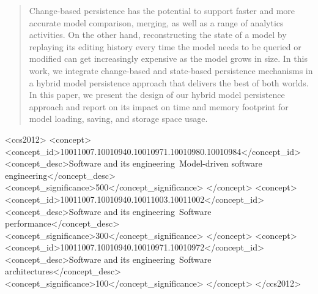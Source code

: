 \documentclass[sigplan,review,anonymous]{acmart}\settopmatter{printfolios=true,printccs=false,printacmref=false}
\begin{document}


\begin{abstract}
Change-based persistence has the potential to support faster and more accurate model comparison, merging, as well as a range of analytics activities. On the other hand, reconstructing the state of a model by replaying its editing history every time the model needs to be queried or modified can get increasingly expensive as the model grows in size. In this work, we integrate change-based and state-based persistence mechanisms in a hybrid model persistence approach that delivers the best of both worlds. In this paper, we present the design of our hybrid model persistence approach and report on its impact on time and memory footprint for model loading, saving, and storage space usage.
\end{abstract}


\begin{CCSXML}
    <ccs2012>
    <concept>
    <concept_id>10011007.10010940.10010971.10010980.10010984</concept_id>
    <concept_desc>Software and its engineering~Model-driven software engineering</concept_desc>
    <concept_significance>500</concept_significance>
    </concept>
    <concept>
    <concept_id>10011007.10010940.10011003.10011002</concept_id>
    <concept_desc>Software and its engineering~Software performance</concept_desc>
    <concept_significance>300</concept_significance>
    </concept>
    <concept>
    <concept_id>10011007.10010940.10010971.10010972</concept_id>
    <concept_desc>Software and its engineering~Software architectures</concept_desc>
    <concept_significance>100</concept_significance>
    </concept>
    </ccs2012>
\end{CCSXML}
\end{document}
